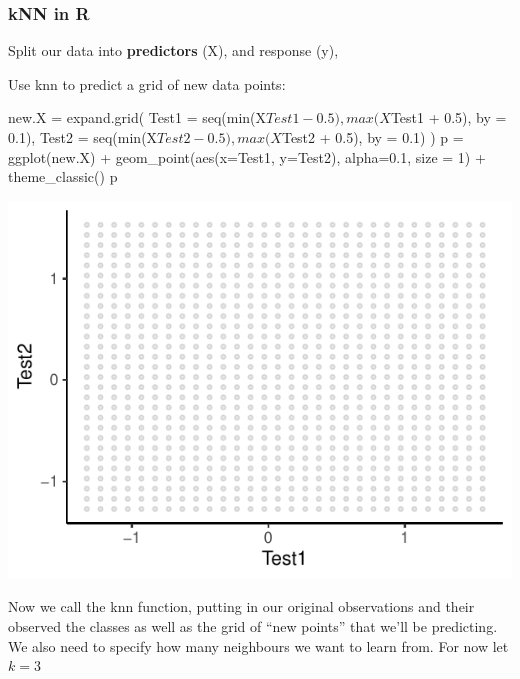 \documentclass[a4paper]{article}
\begin{document}
\subsubsection{kNN in R}
Split our data into \textbf{predictors} (X), and response (y),
\begin{Schunk}
\end{Schunk}
Use knn to predict a grid of new data points:
\begin{Schunk}
\begin{Sinput}
new.X = expand.grid(
  Test1 = seq(min(X$Test1 - 0.5),
              max(X$Test1 + 0.5), 
              by = 0.1),
  Test2 = seq(min(X$Test2 - 0.5), 
              max(X$Test2 + 0.5),
              by = 0.1)
  )
p = ggplot(new.X) +
  geom_point(aes(x=Test1, y=Test2), 
             alpha=0.1, size = 1) +
  theme_classic()
p
\end{Sinput}


{\centering \includegraphics[width=\maxwidth]{figure/listings-unnamed-chunk-453-1} 

}

\end{Schunk}
Now we call the knn function, putting in our original observations and their observed the classes as well as the grid of ``new points'' that we'll be predicting.
We also need to specify how many neighbours we want to learn from. For now let \( k = 3 \) 
\end{document}
